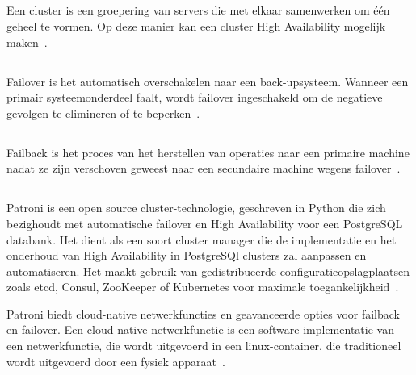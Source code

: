 \subsection{}
\label{subsec:Cluster}

Een cluster is een groepering van servers die met elkaar samenwerken om één geheel te vormen. Op deze manier kan een cluster High Availability mogelijk maken~\autocite{TechTarget2017}.

\subsection{}
\label{subsec:Failover}

Failover is het automatisch overschakelen naar een back-upsysteem. Wanneer een primair systeemonderdeel faalt, wordt failover ingeschakeld om de negatieve gevolgen te elimineren of te beperken~\autocite{AVINetworks2020}.

\subsection{}
\label{subsec:Failback}

Failback is het proces van het herstellen van operaties naar een primaire machine  nadat ze zijn verschoven geweest naar een secundaire machine wegens failover~\autocite{TechTarget2020}.

\subsection{}
\label{subsec:Patroni}


Patroni is een open source cluster-technologie, geschreven in Python die zich bezighoudt met automatische failover en High Availability voor een PostgreSQL databank. Het dient als een soort cluster manager die de implementatie en het onderhoud van High Availability in PostgreSQl clusters zal aanpassen en automatiseren. Het maakt gebruik van gedistribueerde configuratieopslagplaatsen zoals etcd, Consul, ZooKeeper of Kubernetes voor maximale toegankelijkheid~\autocite{Markwort2018}.


Patroni biedt cloud-native netwerkfuncties en geavanceerde opties voor failback en failover. Een cloud-native netwerkfunctie is een software-implementatie van een netwerkfunctie, die wordt uitgevoerd in een linux-container, die traditioneel wordt uitgevoerd door een fysiek apparaat~\autocite{CDNF2020}.

